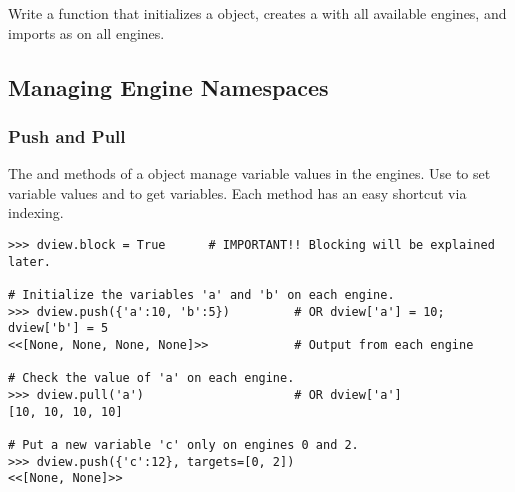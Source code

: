 \begin{problem} %
Write a function that initializes a  object, creates a  with all available engines, and imports  as  on all engines.
\end{problem}


\subsection*{Managing Engine Namespaces} %

\subsubsection*{Push and Pull} %

The  and  methods of a  object manage variable values in the engines.
Use  to set variable values and  to get variables.
Each method has an easy shortcut via indexing.

\begin{lstlisting}
>>> dview.block = True      # IMPORTANT!! Blocking will be explained later.

# Initialize the variables 'a' and 'b' on each engine.
>>> dview.push({'a':10, 'b':5})         # OR dview['a'] = 10; dview['b'] = 5
<<[None, None, None, None]>>            # Output from each engine

# Check the value of 'a' on each engine.
>>> dview.pull('a')                     # OR dview['a']
[10, 10, 10, 10]

# Put a new variable 'c' only on engines 0 and 2.
>>> dview.push({'c':12}, targets=[0, 2])
<<[None, None]>>
\end{lstlisting}

%

